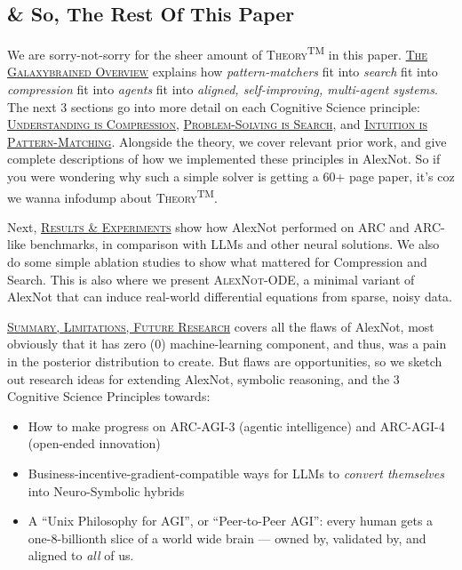 \documentclass[11pt]{article}
\begin{document}
\subsection{\& So, The Rest Of This Paper}

We are sorry-not-sorry for the sheer amount of \textsc{Theory}\textsuperscript{TM} in this paper. \hyperref[sec:overview]{\textsc{The Galaxybrained Overview}} explains how \textit{pattern-matchers} fit into \textit{search} fit into \textit{compression} fit into \textit{agents} fit into \textit{aligned, self-improving, multi-agent systems}. The next 3 sections go into more detail on each Cognitive Science principle: \hyperref[sec:compression]{\textsc{Understanding is Compression}}, \hyperref[sec:search]{\textsc{Problem-Solving is Search}}, and \hyperref[sec:pattern_matching]{\textsc{Intuition is Pattern-Matching}}. Alongside the theory, we cover relevant prior work, and give complete descriptions of how we implemented these principles in AlexNot. So if you were wondering why such a simple solver is getting a 60+ page paper, it's coz we wanna infodump about \textsc{Theory}\textsuperscript{TM}.

Next, \hyperref[sec:results]{\textsc{Results \& Experiments}} show how AlexNot performed on ARC and ARC-like benchmarks, in comparison with LLMs and other neural solutions. We also do some simple ablation studies to show what mattered for Compression and Search. This is also where we present \textsc{AlexNot-ODE}, a minimal variant of AlexNot that can induce real-world differential equations from sparse, noisy data.

\hyperref[sec:limitations]{\textsc{Summary, Limitations, Future Research}} covers all the flaws of AlexNot, most obviously that it has zero (0) machine-learning component, and thus, was a pain in the posterior distribution to create. But flaws are opportunities, so we sketch out research ideas for extending AlexNot, symbolic reasoning, and the 3 Cognitive Science Principles towards:

\begin{itemize}
    \item How to make progress on ARC-AGI-3 (agentic intelligence) and ARC-AGI-4 (open-ended innovation)
    \item  Business-incentive-gradient-compatible ways for LLMs to \textit{convert themselves} into Neuro-Symbolic hybrids
    \item  A ``Unix Philosophy for AGI'', or ``Peer-to-Peer AGI'': every human gets a one-8-billionth slice of a world wide brain — owned by, validated by, and aligned to \textit{all} of us.
\end{itemize}
\end{document}
